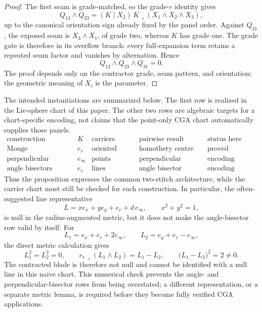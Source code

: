 \documentclass[11pt]{article}
\begin{document}
\begin{proof}
The first seam is grade-matched, so the grade-\(r\) identity gives
\[
Q_{12}\wedge Q_{23}
=(K\mid X_2)\,
K\mathbin{\lrcorner}(X_1\wedge X_2\wedge X_3),
\]
up to the canonical orientation sign already fixed by the panel order.
Against \(Q_{31}\), the exposed seam is \(X_3\wedge X_1\), of grade two,
whereas \(K\) has grade one. The grade gate is therefore in its overflow
branch: every full-expansion term retains a repeated seam factor and vanishes
by alternation. Hence
\[
Q_{12}\wedge Q_{23}\wedge Q_{31}=0.
\]
The proof depends only on the contractor grade, seam pattern, and orientation;
the geometric meaning of \(X_i\) is the parameter.
\end{proof}

The intended instantiations are summarized below. The first row is realized in
the Lie-sphere chart of this paper. The other two rows are algebraic targets
for a chart-specific encoding, not claims that the point-only CGA chart
automatically supplies those panels.
\[
\begin{array}{c|c|c|c|c}
\text{construction} & K & \text{carriers} & \text{pairwise result}
& \text{status here}\\
\hline
\text{Monge} & e_r & \text{oriented circles}
& \text{homothety centre} & \text{proved}\\
\text{perpendicular bisectors} & e_\infty & \text{points}
& \text{perpendicular bisector} & \text{encoding required}\\
\text{angle bisectors} & e_r & \text{lines}
& \text{angle bisector} & \text{encoding required}
\end{array}
\]
Thus the proposition expresses the common two-stitch architecture, while the
carrier chart must still be checked for each construction. In particular, the
often-suggested line representative
\[
L=x e_x+y e_y+e_r+d\,e_\infty,\qquad x^2+y^2=1,
\]
is null in the radius-augmented metric, but it does not make the angle-bisector
row valid by itself. For
\[
L_1=e_x+e_r+2e_\infty,\qquad
L_2=e_y+e_r-e_\infty,
\]
the direct metric calculation gives
\[
L_1^2=L_2^2=0,\qquad
e_r\mathbin{\lrcorner}(L_1\wedge L_2)=L_1-L_2,
\qquad
\bigl(L_1-L_2\bigr)^2=2\ne0.
\]
The contracted blade is therefore not null and cannot be identified with a
null line in this naive chart. This numerical check prevents the angle- and
perpendicular-bisector rows from being overstated; a different
representation, or a separate metric lemma, is required before they become
fully verified CGA applications.
\end{document}
